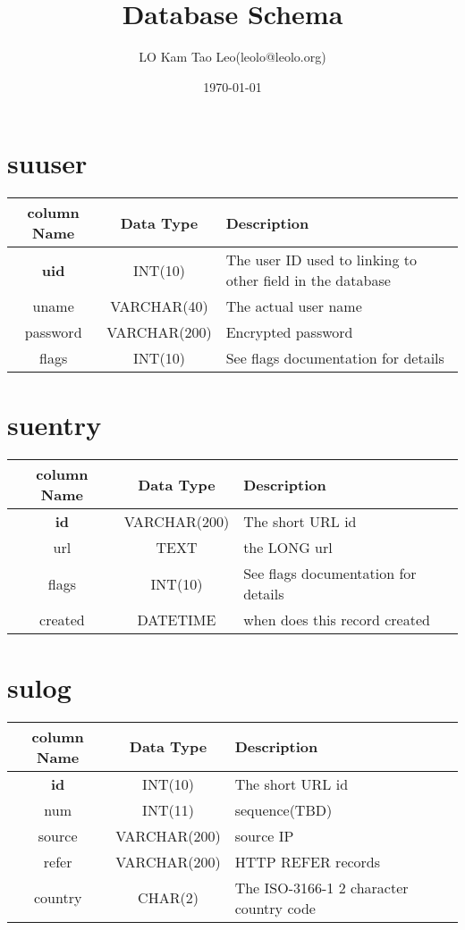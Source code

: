 \documentclass[a4paper,12pt,hidelinks]{article}
\title{Database Schema}
\author{LO Kam Tao Leo(leolo@leolo.org)}
\date{\today}
\begin{document}
\maketitle
\section{su\textunderscore user}
\begin{tabular}{c|c|p{9cm}}
column Name & Data Type &  Description \\ \hline
 \textbf{uid} & INT(10) & The user ID used to linking to other field in the database \\\hline
 uname & VARCHAR(40) &  The actual user name\\\hline
 password & VARCHAR(200) & Encrypted password\\\hline
 flags & INT(10) & See flags documentation for details
\end{tabular}\section{su\textunderscore entry}
\begin{tabular}{c|c|p{9cm}}
column Name & Data Type &  Description \\ \hline
 \textbf{id} & VARCHAR(200) & The short URL id \\\hline
 url & TEXT & the LONG url\\\hline
 flags & INT(10) & See flags documentation for details\\\hline
 created & DATETIME & when does this record created
\end{tabular}\section{su\textunderscore log}
\begin{tabular}{c|c|p{9cm}}
column Name & Data Type &  Description \\ \hline
 \textbf{id} & INT(10) & The short URL id \\\hline
 num & INT(11) & sequence(TBD)\\\hline
 source & VARCHAR(200) & source IP\\\hline
 refer & VARCHAR(200) & HTTP REFER records\\\hline
 country & CHAR(2) & The ISO-3166-1 2 character country code 
\end{tabular}
\end{document}
